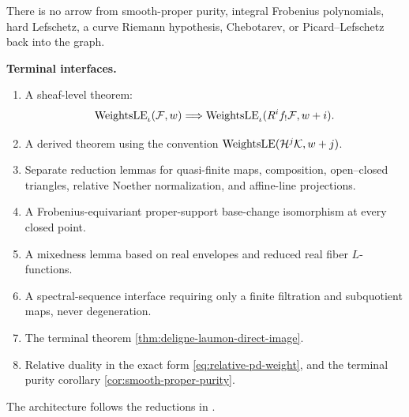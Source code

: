 There is no arrow from smooth-proper purity, integral Frobenius
polynomials, hard Lefschetz, a curve Riemann hypothesis, Chebotarev, or
Picard--Lefschetz back into the graph.

\begin{formalization}
\label{form:global-weight-interface}
\textbf{Terminal interfaces.}

\begin{enumerate}
\item A sheaf-level theorem:
\[
\operatorname{WeightsLE}_\iota(\mathcal F,w)
\Longrightarrow
\operatorname{WeightsLE}_\iota(R^if_!\mathcal F,w+i).
\]
\item A derived theorem using the convention
\(\operatorname{WeightsLE}(\mathcal H^j\mathcal K,w+j)\).
\item Separate reduction lemmas for quasi-finite maps, composition,
open--closed triangles, relative Noether normalization, and affine-line
projections.
\item A Frobenius-equivariant proper-support base-change isomorphism at
every closed point.
\item A mixedness lemma based on real envelopes and reduced real fiber
\(L\)-functions.
\item A spectral-sequence interface requiring only a finite filtration
and subquotient maps, never degeneration.
\item The terminal theorem
\cref{thm:deligne-laumon-direct-image}.
\item Relative duality in the exact form
\eqref{eq:relative-pd-weight}, and the terminal purity corollary
\cref{cor:smooth-proper-purity}.
\end{enumerate}

The architecture follows the reductions in
\cite{DeligneWeilII,LaumonFourier,KiehlWeissauer,StanfordL24}.
\end{formalization}


